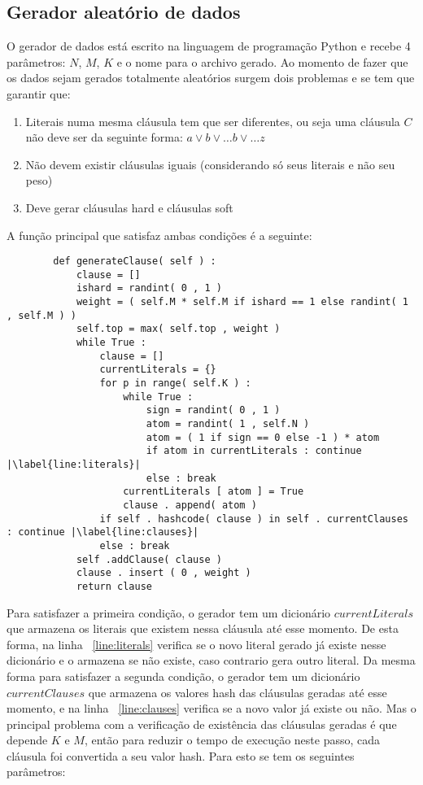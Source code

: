 \subsection{Gerador aleatório de dados}
	O gerador de dados está escrito na linguagem de programação Python e recebe 4 parâmetros: $N$, $M$, $K$ e o nome para o archivo gerado. Ao momento de fazer que os dados sejam gerados totalmente aleatórios surgem dois problemas e se tem que garantir que:
	\begin{enumerate}
		\item Literais numa mesma cláusula tem que ser diferentes, ou seja uma cláusula $C$ não deve ser da seguinte forma: $a \lor b \lor \ldots b \lor \ldots z$
		\item Não devem existir cláusulas iguais (considerando só seus literais e não seu peso)
		\item Deve gerar cláusulas hard e cláusulas soft
	\end{enumerate}
	A função principal que satisfaz ambas condições é a seguinte:
	\begin{lstlisting}
		def generateClause( self ) :
			clause = []
			ishard = randint( 0 , 1 )
			weight = ( self.M * self.M if ishard == 1 else randint( 1 , self.M ) )
			self.top = max( self.top , weight )
			while True :
				clause = []
				currentLiterals = {}
				for p in range( self.K ) :
					while True :
						sign = randint( 0 , 1 )
						atom = randint( 1 , self.N )
						atom = ( 1 if sign == 0 else -1 ) * atom
						if atom in currentLiterals : continue |\label{line:literals}|
						else : break
					currentLiterals [ atom ] = True
					clause . append( atom )
				if self . hashcode( clause ) in self . currentClauses : continue |\label{line:clauses}|
				else : break
			self .addClause( clause )
			clause . insert ( 0 , weight )
			return clause
	\end{lstlisting}
	Para satisfazer a primeira condição, o gerador tem um dicionário ${currentLiterals}$ que armazena os literais que existem nessa cláusula até esse momento. De esta forma, na linha ~\ref{line:literals} verifica se o novo literal gerado já existe nesse dicionário e o armazena se não existe, caso contrario gera outro literal. Da mesma forma para satisfazer a segunda condição, o gerador tem um dicionário ${currentClauses}$ que armazena os valores hash das cláusulas geradas até esse momento, e na linha ~\ref{line:clauses} verifica se a novo valor já existe ou não. Mas o principal problema com a verificação de existência das cláusulas geradas é que depende $K$ e $M$, então para reduzir o tempo de execução neste passo, cada cláusula foi convertida a seu valor hash. Para esto se tem os seguintes parâmetros:
